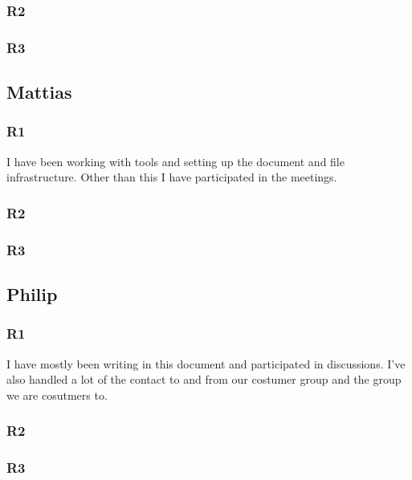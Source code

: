 \documentclass[a4paper]{article}
\begin{document}
    \subsubsection{R2}
    \subsubsection{R3}
  
  \subsection{Mattias}
    \subsubsection{R1}
    I have been working with tools and setting up the document and file infrastructure. Other than this I have participated in the meetings.
    \subsubsection{R2}
    \subsubsection{R3}
  \subsection{Philip}
    \subsubsection{R1}
  I have mostly been writing in this document and participated in discussions. I've also handled a lot of the contact to and from our costumer group and the group we are cosutmers to.
    \subsubsection{R2}
    \subsubsection{R3}
\end{document}
